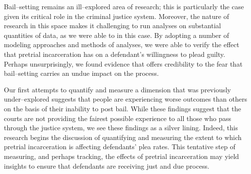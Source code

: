 Bail--setting remains an ill--explored area of research;
this is particularly the case given its critical role in the criminal justice system.
Moreover, the nature of research in this space makes it challenging to
run analyses on substantial quantities of data, as we were able to in this case.
By adopting a number of modeling approaches and methods of analyses,
we were able to verify the effect that pretrial incarceration has on
a defendant's willingness to plead guilty.
Perhaps unsurprisingly,
we found evidence that offers credibility to the fear that bail--setting carries
an undue impact on the process.

Our first attempts to quantify and measure
a dimension that was previously under--explored
suggests that people are experiencing worse outcomes than others
on the basis of their inability to post bail.
While these findings suggest that the courts are not providing the fairest possible
experience to all those who pass through the justice system,
we see these findings as a silver lining.
Indeed, this research begins the discussion of
quantifying and
measuring
the extent to which pretrial incarceration is affecting defendants' plea rates.
This tentative step of measuring, and perhaps tracking, the effects of
pretrial incarceration may yield insights to ensure that defendants are receiving
just and due process.
